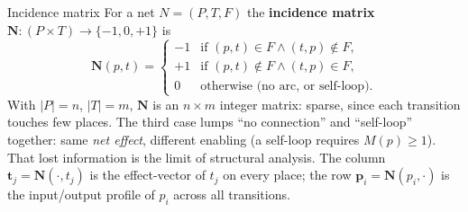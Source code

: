 \begin{definitionbox}{Incidence matrix}
For a net $N = (P, T, F)$ the \textbf{incidence matrix} $\mathbf{N} : (P \times T) \to \{-1, 0, +1\}$ is
\[
\mathbf{N}(p, t) = \begin{cases}
 -1 & \text{if } (p, t) \in F \wedge (t, p) \notin F, \\
 +1 & \text{if } (p, t) \notin F \wedge (t, p) \in F, \\
  0 & \text{otherwise (no arc, or self-loop).}
\end{cases}
\]
With $|P| = n$, $|T| = m$, $\mathbf{N}$ is an $n \times m$ integer matrix: sparse, since each transition touches few places. The third case lumps ``no connection'' and ``self-loop'' together: same \emph{net effect}, different enabling (a self-loop requires $M(p) \geq 1$). That lost information is the limit of structural analysis. The column $\mathbf{t}_j = \mathbf{N}(\cdot, t_j)$ is the effect-vector of $t_j$ on every place; the row $\mathbf{p}_i = \mathbf{N}(p_i, \cdot)$ is the input/output profile of $p_i$ across all transitions.
\end{definitionbox}

